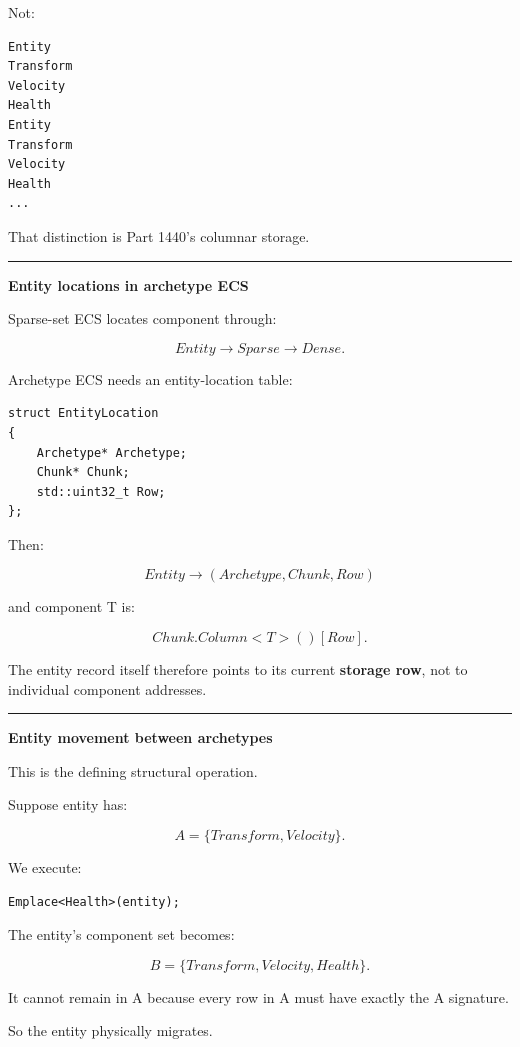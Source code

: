 Not:

\begin{verbatim}
Entity
Transform
Velocity
Health
Entity
Transform
Velocity
Health
...
\end{verbatim}

That distinction is Part 1440's columnar storage.

\begin{center}\rule{0.5\linewidth}{0.5pt}\end{center}

\textbf{Entity locations in archetype ECS}

Sparse-set ECS locates component through:

\[
Entity\rightarrow Sparse\rightarrow Dense.
\]

Archetype ECS needs an entity-location table:

\begin{verbatim}
struct EntityLocation
{
    Archetype* Archetype;
    Chunk* Chunk;
    std::uint32_t Row;
};
\end{verbatim}

Then:

\[
Entity
\rightarrow
(Archetype,Chunk,Row)
\]

and component T is:

\[
Chunk.Column<T>()[Row].
\]

The entity record itself therefore points to its current \textbf{storage row}, not to individual component addresses.

\begin{center}\rule{0.5\linewidth}{0.5pt}\end{center}

\textbf{Entity movement between archetypes}

This is the defining structural operation.

Suppose entity has:

\[
A=\{Transform,Velocity\}.
\]

We execute:

\begin{verbatim}
Emplace<Health>(entity);
\end{verbatim}

The entity's component set becomes:

\[
B=\{Transform,Velocity,Health\}.
\]

It cannot remain in A because every row in A must have exactly the A signature.

So the entity physically migrates.

